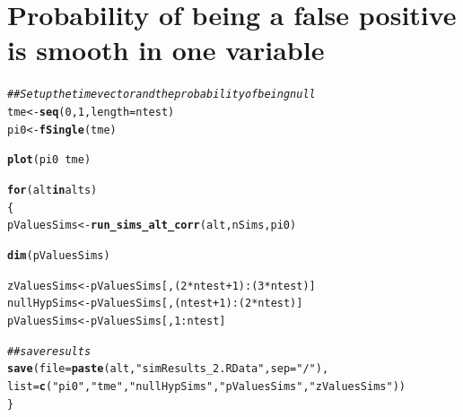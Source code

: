\documentclass{article}\usepackage[]{graphicx}\usepackage[]{color}
\makeatletter
\newcommand{\hlnum}[1]{\textcolor[rgb]{0.686,0.059,0.569}{#1}}%
\newcommand{\hlstr}[1]{\textcolor[rgb]{0.192,0.494,0.8}{#1}}%
\newcommand{\hlcom}[1]{\textcolor[rgb]{0.678,0.584,0.686}{\textit{#1}}}%
\newcommand{\hlopt}[1]{\textcolor[rgb]{0,0,0}{#1}}%
\newcommand{\hlstd}[1]{\textcolor[rgb]{0.345,0.345,0.345}{#1}}%
\newcommand{\hlkwa}[1]{\textcolor[rgb]{0.161,0.373,0.58}{\textbf{#1}}}%
\newcommand{\hlkwb}[1]{\textcolor[rgb]{0.69,0.353,0.396}{#1}}%
\newcommand{\hlkwc}[1]{\textcolor[rgb]{0.333,0.667,0.333}{#1}}%
\newcommand{\hlkwd}[1]{\textcolor[rgb]{0.737,0.353,0.396}{\textbf{#1}}}%
\newenvironment{kframe}{%
 \def\at@end@of@kframe{}%
 \ifinner\ifhmode%
  \def\at@end@of@kframe{\end{minipage}}%
  \begin{minipage}{\columnwidth}%
 \fi\fi%
 \def\FrameCommand##1{\hskip\@totalleftmargin \hskip-\fboxsep
 \colorbox{shadecolor}{##1}\hskip-\fboxsep
     \hskip-\linewidth \hskip-\@totalleftmargin \hskip\columnwidth}%
 \MakeFramed {\advance\hsize-\width
   \@totalleftmargin\z@ \linewidth\hsize
   \@setminipage}}%
 {\par\unskip\endMakeFramed%
 \at@end@of@kframe}
\newenvironment{knitrout}{}{} %
\makeatother
\begin{document}
\section{Probability of being a false positive is smooth in one variable}

\begin{knitrout}
\color{fgcolor}\begin{kframe}
\begin{alltt}
\hlcom{## Set up the time vector and the probability of being null}
\hlstd{tme} \hlkwb{<-} \hlkwd{seq}\hlstd{(}\hlnum{0}\hlstd{,}\hlnum{1}\hlstd{,} \hlkwc{length}\hlstd{=ntest)}
\hlstd{pi0} \hlkwb{<-} \hlkwd{fSingle}\hlstd{(tme)}

\hlkwd{plot}\hlstd{(pi0} \hlopt{~} \hlstd{tme)}

\hlkwa{for}\hlstd{(alt} \hlkwa{in} \hlstd{alts)}
\hlstd{\{}
  \hlstd{pValuesSims} \hlkwb{<-} \hlkwd{run_sims_alt_corr}\hlstd{(alt, nSims, pi0)}

  \hlkwd{dim}\hlstd{(pValuesSims)}

  \hlstd{zValuesSims} \hlkwb{<-} \hlstd{pValuesSims[,(}\hlnum{2}\hlopt{*}\hlstd{ntest}\hlopt{+}\hlnum{1}\hlstd{)}\hlopt{:}\hlstd{(}\hlnum{3}\hlopt{*}\hlstd{ntest)]}
  \hlstd{nullHypSims} \hlkwb{<-} \hlstd{pValuesSims[,(ntest}\hlopt{+}\hlnum{1}\hlstd{)}\hlopt{:}\hlstd{(}\hlnum{2}\hlopt{*}\hlstd{ntest)]}
  \hlstd{pValuesSims} \hlkwb{<-} \hlstd{pValuesSims[,}\hlnum{1}\hlopt{:}\hlstd{ntest]}

  \hlcom{##save results}
  \hlkwd{save}\hlstd{(}\hlkwc{file}\hlstd{=}\hlkwd{paste}\hlstd{(alt,} \hlstr{"simResults_2.RData"}\hlstd{,}\hlkwc{sep}\hlstd{=}\hlstr{"/"}\hlstd{),}
       \hlkwc{list}\hlstd{=}\hlkwd{c}\hlstd{(}\hlstr{"pi0"}\hlstd{,} \hlstr{"tme"}\hlstd{,} \hlstr{"nullHypSims"}\hlstd{,}\hlstr{"pValuesSims"}\hlstd{,}\hlstr{"zValuesSims"}\hlstd{))}
\hlstd{\}}
\end{alltt}
\end{kframe}


\end{knitrout}
\end{document}
